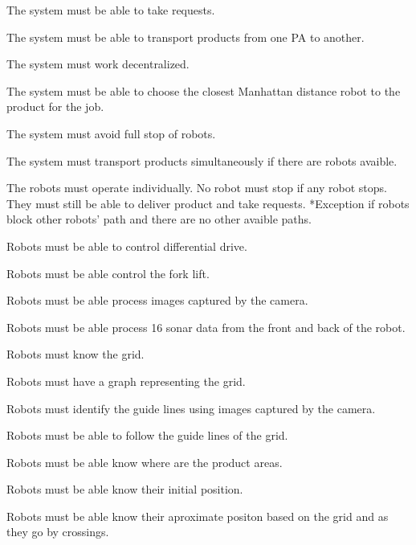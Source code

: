 \begin{FR}
	
	


	\item The system must be able to take requests. %
	\item The system must be able to transport products from one PA to another. %
	\item The system must work decentralized. %
	\item The system must be able to choose the closest Manhattan distance robot to the product for the job. %
	\item The system must avoid full stop of robots. %
	\item The system must transport products simultaneously if there are robots avaible. %
	\item The robots must operate individually. No robot must stop if any robot stops. They must still be able to deliver product and take requests. *Exception if robots block other robots' path and there are no other avaible paths. %
	\item Robots must be able to control differential drive. %
	\item Robots must be able control the fork lift. %
	\item Robots must be able process images captured by the camera. %
	\item Robots must be able process 16 sonar data from the front and back of the robot. %
	\item Robots must know the grid. %
	\item Robots must have a graph representing the grid. %
	\item Robots must identify the guide lines using images captured by the camera. %
	\item Robots must be able to follow the guide lines of the grid. %
	\item Robots must be able know where are the product areas. %
	\item Robots must be able know their initial position. %
	\item Robots must be able know their aproximate positon based on the grid and as they go by crossings. %

\end{FR}
